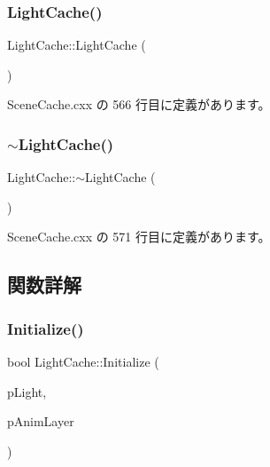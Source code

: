 \subsubsection{\texorpdfstring{Light\+Cache()}{LightCache()}}
{\footnotesize\ttfamily Light\+Cache\+::\+Light\+Cache (\begin{DoxyParamCaption}{ }\end{DoxyParamCaption})}



 Scene\+Cache.\+cxx の 566 行目に定義があります。

\mbox{\label{class_light_cache_ad747d6d03a917cfab8c33fcc54349af3}} 
\subsubsection{\texorpdfstring{$\sim$\+Light\+Cache()}{~LightCache()}}
{\footnotesize\ttfamily Light\+Cache\+::$\sim$\+Light\+Cache (\begin{DoxyParamCaption}{ }\end{DoxyParamCaption})}



 Scene\+Cache.\+cxx の 571 行目に定義があります。



\subsection{関数詳解}
\mbox{\label{class_light_cache_af1360bf788b0435dc2ad38f62e1ce848}} 
\subsubsection{\texorpdfstring{Initialize()}{Initialize()}}
{\footnotesize\ttfamily bool Light\+Cache\+::\+Initialize (\begin{DoxyParamCaption}\item[{const \hyperlink{class_fbx_light}{Fbx\+Light} $\ast$}]{p\+Light,  }\item[{\hyperlink{class_fbx_anim_layer}{Fbx\+Anim\+Layer} $\ast$}]{p\+Anim\+Layer }\end{DoxyParamCaption})}



